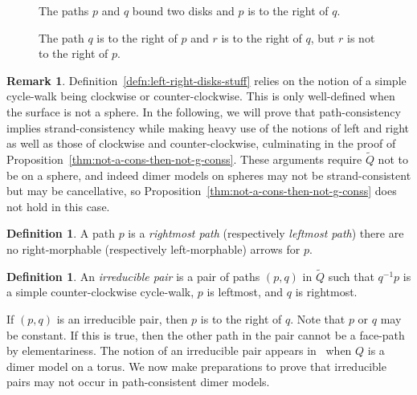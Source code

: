 \documentclass{article}
\theoremstyle{definition}
\newtheorem{defn}[thm]{Definition}
\newtheorem{remk}[thm]{Remark}
\begin{document}
\def\svgwidth{200pt}
\begin{figure}[htbp]
    \centering
	
    \caption{The paths $p$ and $q$ bound two disks and $p$ is to the right of $q$.}
	\label{ex:disksbounded}
\end{figure}

\def\svgwidth{100pt}
\begin{figure}	
	\centering
	
	\caption{The path $q$ is to the right of $p$ and $r$ is to the right of $q$, but $r$ is not to the right of $p$.}
\label{fig:lr-not-trans}
\end{figure}

\begin{remk}
	Definition~\ref{defn:left-right-disks-stuff} relies on the notion of a simple cycle-walk being clockwise or counter-clockwise. This is only well-defined when the surface is not a sphere. In the following, we will prove that path-consistency implies strand-consistency while making heavy use of the notions of left and right as well as those of clockwise and counter-clockwise, culminating in the proof of
Proposition~\ref{thm:not-a-cons-then-not-g-conss}. 
	These arguments require $\widetilde Q$ not to be on a sphere, and indeed dimer models on spheres may not be strand-consistent but may be cancellative, so Proposition~\ref{thm:not-a-cons-then-not-g-conss} does not hold in this case. 
\end{remk}

\begin{defn}\label{defn:rightmost-leftmost-paths}
    A path $p$ is a \textit{rightmost path} (respectively \textit{leftmost path}) there are no right-morphable (respectively left-morphable) arrows for $p$.
\end{defn}

\begin{defn}\label{defn:irreducible-pair}
	An \textit{irreducible pair} is a pair of paths $(p,q)$ in $\widetilde Q$ such that $q^{-1}p$ is a simple counter-clockwise cycle-walk, $p$ is leftmost, and $q$ is rightmost.
\end{defn}

If $(p,q)$ is an irreducible pair, then $p$ is to the right of $q$.
Note that $p$ or $q$ may be constant. If this is true, then the other path in the pair cannot be a face-path by elementariness.
The notion of an irreducible pair appears in~\cite{XBocklandt2011} when $Q$ is a dimer model on a torus. 
We now make preparations to prove that irreducible pairs may not occur in path-consistent dimer models.
\end{document}
